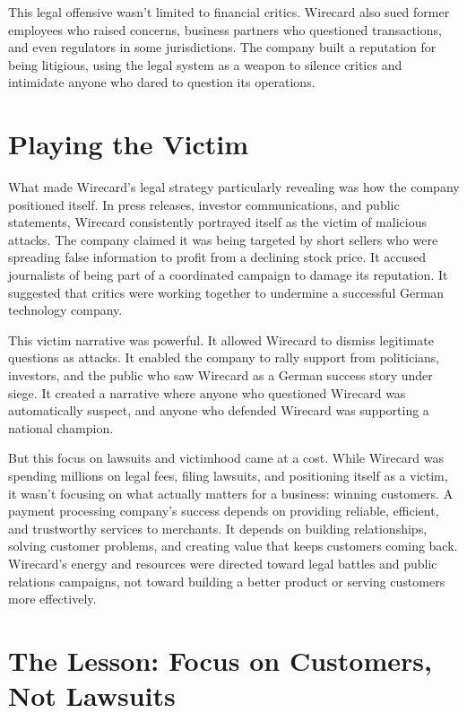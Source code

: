 This legal offensive wasn't limited to financial critics. Wirecard also sued former employees who raised concerns, business partners who questioned transactions, and even regulators in some jurisdictions. The company built a reputation for being litigious, using the legal system as a weapon to silence critics and intimidate anyone who dared to question its operations.

\section{Playing the Victim}

What made Wirecard's legal strategy particularly revealing was how the company positioned itself. In press releases, investor communications, and public statements, Wirecard consistently portrayed itself as the victim of malicious attacks. The company claimed it was being targeted by short sellers who were spreading false information to profit from a declining stock price. It accused journalists of being part of a coordinated campaign to damage its reputation. It suggested that critics were working together to undermine a successful German technology company.

This victim narrative was powerful. It allowed Wirecard to dismiss legitimate questions as attacks. It enabled the company to rally support from politicians, investors, and the public who saw Wirecard as a German success story under siege. It created a narrative where anyone who questioned Wirecard was automatically suspect, and anyone who defended Wirecard was supporting a national champion.

But this focus on lawsuits and victimhood came at a cost. While Wirecard was spending millions on legal fees, filing lawsuits, and positioning itself as a victim, it wasn't focusing on what actually matters for a business: winning customers. A payment processing company's success depends on providing reliable, efficient, and trustworthy services to merchants. It depends on building relationships, solving customer problems, and creating value that keeps customers coming back. Wirecard's energy and resources were directed toward legal battles and public relations campaigns, not toward building a better product or serving customers more effectively.

\section{The Lesson: Focus on Customers, Not Lawsuits}

